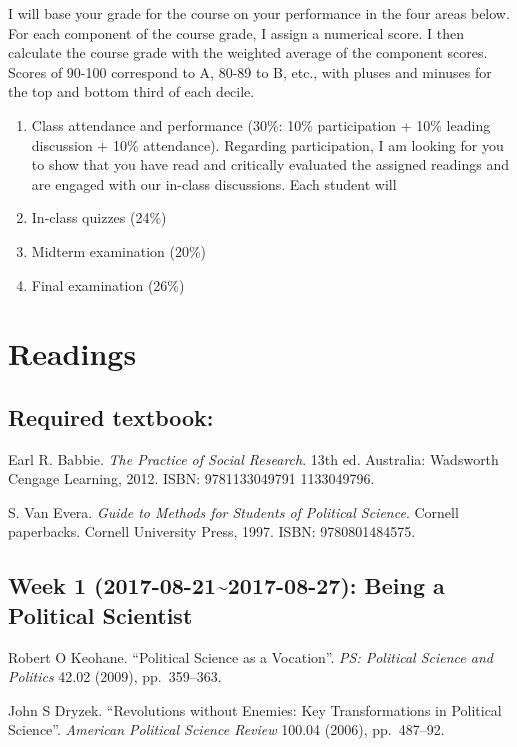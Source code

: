 \documentclass[11pt,]{article}
\begin{document}
I will base your grade for the course on your performance in the four
areas below. For each component of the course grade, I assign a
numerical score. I then calculate the course grade with the weighted
average of the component scores. Scores of 90-100 correspond to A, 80-89
to B, etc., with pluses and minuses for the top and bottom third of each
decile.

\begin{enumerate}
\def\labelenumi{\arabic{enumi}.}
\item
  Class attendance and performance (30\%: 10\% participation + 10\%
  leading discussion + 10\% attendance). Regarding participation, I am
  looking for you to show that you have read and critically evaluated
  the assigned readings and are engaged with our in-class discussions.
  Each student will
\item
  In-class quizzes (24\%)
\item
  Midterm examination (20\%)
\item
  Final examination (26\%)
\end{enumerate}

\section{Readings}\label{readings}

\subsection{Required textbook:}\label{required-textbook}

Earl R. Babbie. \emph{The Practice of Social Research}. 13th ed.
Australia: Wadsworth Cengage Learning, 2012. ISBN: 9781133049791
1133049796.

S. Van Evera. \emph{Guide to Methods for Students of Political Science}.
Cornell paperbacks. Cornell University Press, 1997. ISBN: 9780801484575.

\subsection{Week 1 (2017-08-21\textasciitilde{}2017-08-27): Being a
Political
Scientist}\label{week-1-2017-08-212017-08-27-being-a-political-scientist}

Robert O Keohane. ``Political Science as a Vocation''.
\emph{PS: Political Science and Politics} 42.02 (2009), pp.~359--363.

John S Dryzek. ``Revolutions without Enemies: Key Transformations in
Political Science''. \emph{American Political Science Review} 100.04
(2006), pp.~487--92.
\end{document}
